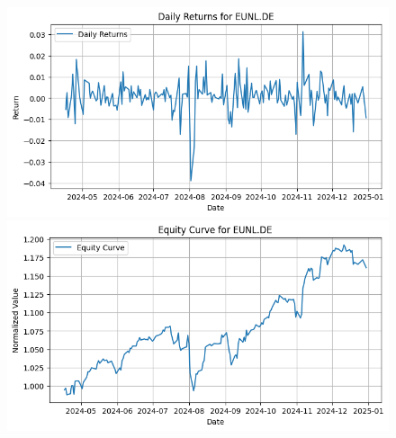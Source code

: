 \documentclass{article}%
\begin{document}
\begin{figure}[htbp]%
\begin{minipage}{0.49\textwidth}%
\includegraphics[width=\linewidth]{ticker_images/EUNL.DE_daily_returns.png}%
\end{minipage}%
\begin{minipage}{0.49\textwidth}%
\includegraphics[width=\linewidth]{ticker_images/EUNL.DE_equity_curve.png}%
\end{minipage}%
\end{figure}

%
\end{document}

